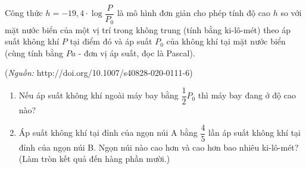 \begin{vd}%
	Công thức $h=-19{,}4\cdot\log\dfrac{P}{P_0}$ là mô hình đơn giản cho phép tính độ cao $h$ so với mặt nước biển của một vị trí trong không trung (tính bằng ki-lô-mét) theo áp suất không khí $P$ tại điểm đó và áp suất $P_0$ của không khí tại mặt nước biển (cùng tính bằng $Pa$ - đơn vị áp suất, đọc là Pascal).
	\begin{center}
		(\textit{Nguồn:}  http://doi.org/10.1007/s40828-020-0111-6)
	\end{center}
	\begin{enumerate}
		\item Nếu áp suất không khí ngoài máy bay bằng $\dfrac{1}{2}P_0$ thì máy bay đang ở độ cao nào?
		\item Áp suất không khí tại đỉnh của ngọn núi A bằng $\dfrac{4}{5}$ lần áp suất không khí tại đỉnh của ngọn núi B. Ngọn núi nào cao hơn và cao hơn bao nhiêu ki-lô-mét? (Làm tròn kết quả đến hàng phần mười.)
	\end{enumerate}
\end{vd}

